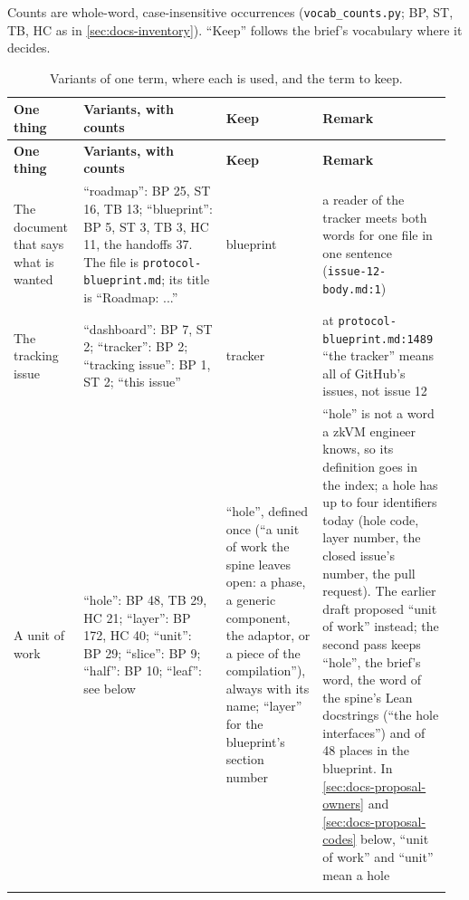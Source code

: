 \label{sec:docs-vocabulary}

\begin{sloppypar}
Counts are whole-word, case-insensitive occurrences (\texttt{vocab\_\allowbreak{}counts.\allowbreak{}py}; BP, ST, TB, HC as in \cref{sec:docs-inventory}). ``Keep'' follows the brief's vocabulary where it decides.
\end{sloppypar}

{\footnotesize\setlength{\tabcolsep}{3pt}
\begin{longtable}{@{}>{\raggedright\arraybackslash}p{0.143\linewidth}>{\raggedright\arraybackslash}p{0.316\linewidth}>{\raggedright\arraybackslash}p{0.210\linewidth}>{\raggedright\arraybackslash}p{0.287\linewidth}@{}}
\caption{Variants of one term, where each is used, and the term to keep.}\label{tab:docs-vocabulary}\\
\toprule
\textbf{One thing} & \textbf{Variants, with counts} & \textbf{Keep} & \textbf{Remark} \\
\midrule
\endfirsthead
\toprule
\textbf{One thing} & \textbf{Variants, with counts} & \textbf{Keep} & \textbf{Remark} \\
\midrule
\endhead
\bottomrule
\endfoot
The document that says what is wanted & ``roadmap'': BP 25, ST 16, TB 13; ``blueprint'': BP 5, ST 3, TB 3, HC 11, the handoffs 37. The file is \texttt{protocol-\allowbreak{}blueprint.\allowbreak{}md}; its title is ``Roadmap: ...'' & blueprint & a reader of the tracker meets both words for one file in one sentence (\texttt{issue-\allowbreak{}12-\allowbreak{}body.\allowbreak{}md:\allowbreak{}1}) \\\addlinespace[2pt]
The tracking issue & ``dashboard'': BP 7, ST 2; ``tracker'': BP 2; ``tracking issue'': BP 1, ST 2; ``this issue'' & tracker & at \texttt{protocol-\allowbreak{}blueprint.\allowbreak{}md:\allowbreak{}1489} ``the tracker'' means all of GitHub's issues, not issue 12 \\\addlinespace[2pt]
A unit of work & ``hole'': BP 48, TB 29, HC 21; ``layer'': BP 172, HC 40; ``unit'': BP 29; ``slice'': BP 9; ``half'': BP 10; ``leaf'': see below & ``hole'', defined once (``a unit of work the spine leaves open: a phase, a generic component, the adaptor, or a piece of the compilation''), always with its name; ``layer'' for the blueprint's section number & ``hole'' is not a word a zkVM engineer knows, so its definition goes in the index; a hole has up to four identifiers today (hole code, layer number, the closed issue's number, the pull request). The earlier draft proposed ``unit of work'' instead; the second pass keeps ``hole'', the brief's word, the word of the spine's Lean docstrings (``the hole interfaces'') and of 48 places in the blueprint. In \cref{sec:docs-proposal-owners} and \cref{sec:docs-proposal-codes} below, ``unit of work'' and ``unit'' mean a hole \\\addlinespace[2pt]

\end{longtable}}
